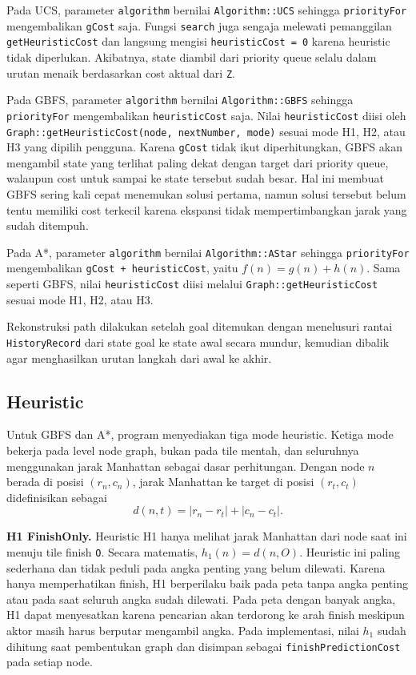 \documentclass[a4paper,11pt]{article}
\begin{document}
Pada UCS, parameter \texttt{algorithm} bernilai \texttt{Algorithm::UCS} sehingga \texttt{priorityFor} mengembalikan \texttt{gCost} saja. Fungsi \texttt{search} juga sengaja melewati pemanggilan \texttt{getHeuristicCost} dan langsung mengisi \texttt{heuristicCost = 0} karena heuristic tidak diperlukan. Akibatnya, state diambil dari priority queue selalu dalam urutan menaik berdasarkan cost aktual dari \texttt{Z}.

Pada GBFS, parameter \texttt{algorithm} bernilai \texttt{Algorithm::GBFS} sehingga \texttt{priorityFor} mengembalikan \texttt{heuristicCost} saja. Nilai \texttt{heuristicCost} diisi oleh \texttt{Graph::getHeuristicCost(node, nextNumber, mode)} sesuai mode H1, H2, atau H3 yang dipilih pengguna. Karena \texttt{gCost} tidak ikut diperhitungkan, GBFS akan mengambil state yang terlihat paling dekat dengan target dari priority queue, walaupun cost untuk sampai ke state tersebut sudah besar. Hal ini membuat GBFS sering kali cepat menemukan solusi pertama, namun solusi tersebut belum tentu memiliki cost terkecil karena ekspansi tidak mempertimbangkan jarak yang sudah ditempuh.

Pada A*, parameter \texttt{algorithm} bernilai \texttt{Algorithm::AStar} sehingga \texttt{priorityFor} mengembalikan \texttt{gCost + heuristicCost}, yaitu $f(n) = g(n) + h(n)$. Sama seperti GBFS, nilai \texttt{heuristicCost} diisi melalui \texttt{Graph::getHeuristicCost} sesuai mode H1, H2, atau H3.

Rekonstruksi path dilakukan setelah goal ditemukan dengan menelusuri rantai \texttt{HistoryRecord} dari state goal ke state awal secara mundur, kemudian dibalik agar menghasilkan urutan langkah dari awal ke akhir.

\subsection{Heuristic}
\label{subsec:heuristic}
Untuk GBFS dan A*, program menyediakan tiga mode heuristic. Ketiga mode bekerja pada level node graph, bukan pada tile mentah, dan seluruhnya menggunakan jarak Manhattan sebagai dasar perhitungan. Dengan node $n$ berada di posisi $(r_n, c_n)$, jarak Manhattan ke target di posisi $(r_t, c_t)$ didefinisikan sebagai
\[
d(n, t) = |r_n - r_t| + |c_n - c_t|.
\]

\textbf{H1 FinishOnly.} Heuristic H1 hanya melihat jarak Manhattan dari node saat ini menuju tile finish \texttt{O}. Secara matematis, $h_1(n) = d(n, O)$. Heuristic ini paling sederhana dan tidak peduli pada angka penting yang belum dilewati. Karena hanya memperhatikan finish, H1 berperilaku baik pada peta tanpa angka penting atau pada saat seluruh angka sudah dilewati. Pada peta dengan banyak angka, H1 dapat menyesatkan karena pencarian akan terdorong ke arah finish meskipun aktor masih harus berputar mengambil angka. Pada implementasi, nilai $h_1$ sudah dihitung saat pembentukan graph dan disimpan sebagai \texttt{finishPredictionCost} pada setiap node.
\end{document}
